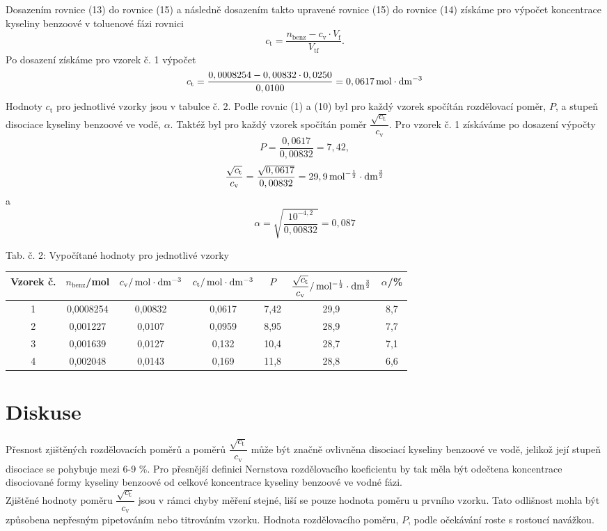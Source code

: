 \documentclass[12pt,a4paper]{article}
\def\ri#1{\mathrm{#1}}
\def\jd#1{\ifmmode\,\mathrm{#1}\else\,\textrm{#1}\fi}
\begin{document}
Dosazením rovnice (13) do rovnice (15) a následně dosazením takto upravené rovnice (15) do rovnice (14) získáme pro výpočet koncentrace kyseliny benzoové v toluenové fázi rovnici
\begin{equation}
	c_\ri{t} = \dfrac{n_\ri{benz} - c_\ri{v}\cdot V_\ri{f}}{V_\ri{tf}}.
\end{equation}
Po dosazení získáme pro vzorek č. 1 výpočet
$$c_\ri{t} = \dfrac{0,0008254 - 0,00832\cdot 0,0250}{0,0100} = 0,0617\jd{mol\cdot dm^{-3}}$$
Hodnoty $c_\ri{t}$ pro jednotlivé vzorky jsou v tabulce č. 2. Podle rovnic (1) a (10) byl pro každý vzorek spočítán rozdělovací poměr, $P$, a stupeň disociace kyseliny benzoové ve vodě, $\alpha$. Taktéž byl pro každý vzorek spočítán poměr $\dfrac{\sqrt{c_\ri{t}}}{c_\ri{v}}$. Pro vzorek č. 1 získáváme po dosazení výpočty
$$P=\dfrac{0,0617}{0,00832} = 7,42,$$
$$\dfrac{\sqrt{c_\ri{t}}}{c_\ri{v}} = \dfrac{\sqrt{0,0617}}{0,00832} = 29,9\jd{mol^{-\frac{1}{2}}\cdot dm^{\frac{3}{2}}}$$
a
$$\alpha = \sqrt{\dfrac{10^{-4,2}}{0,00832}} = 0,087$$
\begin{center}
	\noindent Tab. č. 2: Vypočítané hodnoty pro jednotlivé vzorky\\
	\begin{tabular}{c|c|c|c|c|c|c}
		Vzorek č. & $n_\ri{benz}$/mol & $c_\ri{v}/\jd{mol\cdot dm^{-3}}$ & $c_\ri{t}/\jd{mol\cdot dm^{-3}}$ & $P$ & $\dfrac{\sqrt{c_\ri{t}}}{c_\ri{v}}/\jd{mol^{-\frac{1}{2}}\cdot dm^{\frac{3}{2}}}$ & $\alpha$/\%\\
		\hline
		1 & 0,0008254 & 0,00832 & 0,0617 & 7,42 & 29,9 & 8,7\\
		2 & 0,001227 & 0,0107 & 0,0959 & 8,95 & 28,9 & 7,7\\
		3 & 0,001639 & 0,0127 & 0,132 & 10,4 & 28,7 & 7,1\\
		4 & 0,002048 & 0,0143 & 0,169 & 11,8 & 28,8 & 6,6\\
	\end{tabular}
\end{center}
\section*{Diskuse}
Přesnost zjištěných rozdělovacích poměrů a poměrů $\dfrac{\sqrt{c_\ri{t}}}{c_\ri{v}}$ může být značně ovlivněna disociací kyseliny benzoové ve vodě, jelikož její stupeň disociace se pohybuje mezi 6-9\jd{\%}. Pro přesnější definici Nernstova rozdělovacího koeficientu by tak měla být odečtena koncentrace disociované formy kyseliny benzoové od celkové koncentrace kyseliny benzoové ve vodné fázi.\\
Zjištěné hodnoty poměru $\dfrac{\sqrt{c_\ri{t}}}{c_\ri{v}}$ jsou v rámci chyby měření stejné, liší se pouze hodnota poměru u prvního vzorku. Tato odlišnost mohla být způsobena nepřesným pipetováním nebo titrováním vzorku. Hodnota rozdělovacího poměru, $P$, podle očekávání roste s rostoucí navážkou.
\newpage
\end{document}
